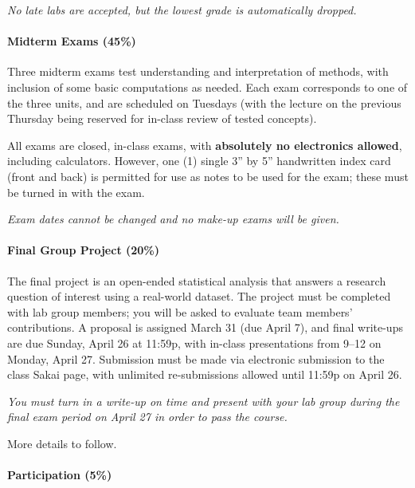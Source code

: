 \documentclass[
]{article}
\begin{document}
\emph{No late labs are accepted, but the lowest grade is automatically
dropped.}

\hypertarget{midterm-exams-45}{%
\paragraph{Midterm Exams (45\%)}\label{midterm-exams-45}}

Three midterm exams test understanding and interpretation of methods,
with inclusion of some basic computations as needed. Each exam
corresponds to one of the three units, and are scheduled on Tuesdays
(with the lecture on the previous Thursday being reserved for in-class
review of tested concepts).

All exams are closed, in-class exams, with \textbf{absolutely no
electronics allowed}, including calculators. However, one (1) single 3''
by 5'' handwritten index card (front and back) is permitted for use as
notes to be used for the exam; these must be turned in with the exam.

\emph{Exam dates cannot be changed and no make-up exams will be given.}

\hypertarget{final-group-project-20}{%
\paragraph{Final Group Project (20\%)}\label{final-group-project-20}}

The final project is an open-ended statistical analysis that answers a
research question of interest using a real-world dataset. The project
must be completed with lab group members; you will be asked to evaluate
team members' contributions. A proposal is assigned March 31 (due April
7), and final write-ups are due Sunday, April 26 at 11:59p, with
in-class presentations from 9--12 on Monday, April 27. Submission must
be made via electronic submission to the class Sakai page, with
unlimited re-submissions allowed until 11:59p on April 26.

\emph{You must turn in a write-up on time and present with your lab
group during the final exam period on April 27 in order to pass the
course.}

More details to follow.

\hypertarget{participation-5}{%
\paragraph{Participation (5\%)}\label{participation-5}}
\end{document}
